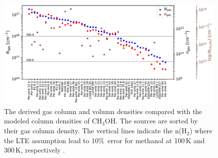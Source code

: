 \documentclass[twocolumn]{aastex62}
\newcommand{\methanol}{\mbox{CH$_{3}$OH}}
\begin{document}
\begin{figure}[htbp!]
  \centering
  \includegraphics[width=\textwidth]{Ngas_ngas.pdf}
  \caption{The derived gas column and volumn densities compared with the modeled column densities of \methanol.  The sources are sorted by their gas column density.  The vertical lines indicate the n(H$_2$) where the LTE assumption lead to 10\%\ error for methanol at 100\,K and 300\,K, respectively \citep{2016A&A...595A.117J}.}
  \label{fig:Ngas_ngas}
\end{figure}

% 


\end{document}
